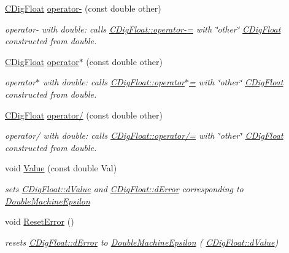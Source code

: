\begin{DoxyCompactItemize}
\hyperlink{classCDigFloat}{C\+Dig\+Float} \hyperlink{classCDigFloat_ad873c5c22f0f18e89caf7309a043bfa0}{operator-\/} (const double other)
\begin{DoxyCompactList}\small\item\em operator-\/ with double\+: calls \hyperlink{classCDigFloat_a7496a4f8445815e9a346076c3d90305a}{C\+Dig\+Float\+::operator-\/=} with \char`\"{}other\char`\"{} \hyperlink{classCDigFloat}{C\+Dig\+Float} constructed from double. \end{DoxyCompactList}\item 
\hyperlink{classCDigFloat}{C\+Dig\+Float} \hyperlink{classCDigFloat_aa699c4362ad8acfcd1649f93d805e105}{operator$\ast$} (const double other)
\begin{DoxyCompactList}\small\item\em operator$\ast$ with double\+: calls \hyperlink{classCDigFloat_a9535d47a31a3f1cfa487cc8c567a4a12}{C\+Dig\+Float\+::operator$\ast$=} with \char`\"{}other\char`\"{} \hyperlink{classCDigFloat}{C\+Dig\+Float} constructed from double. \end{DoxyCompactList}\item 
\hyperlink{classCDigFloat}{C\+Dig\+Float} \hyperlink{classCDigFloat_a4e9cc3b14f2b5a6d704957fb1a8de1a2}{operator/} (const double other)
\begin{DoxyCompactList}\small\item\em operator/ with double\+: calls \hyperlink{classCDigFloat_a53d3939dfc89d172f1bf803a46bc3369}{C\+Dig\+Float\+::operator/=} with \char`\"{}other\char`\"{} \hyperlink{classCDigFloat}{C\+Dig\+Float} constructed from double. \end{DoxyCompactList}\item 
void \hyperlink{classCDigFloat_af74b8cd0935294b6371f551b7a1ff640}{Value} (const double Val)
\begin{DoxyCompactList}\small\item\em sets \hyperlink{classCDigFloat_a4bbe69e30dd4e20527362493aa9aaf96}{C\+Dig\+Float\+::d\+Value} and \hyperlink{classCDigFloat_a25eb3782d1e727ff007a48f8308e3d4d}{C\+Dig\+Float\+::d\+Error} corresponding to \hyperlink{Utils_8h_adb19ed17b4e8ed0a8525c35fdc8872c3}{Double\+Machine\+Epsilon} \end{DoxyCompactList}\item 
void \hyperlink{classCDigFloat_a47dd744a2100dc850ede1511e616ed39}{Reset\+Error} ()
\begin{DoxyCompactList}\small\item\em resets \hyperlink{classCDigFloat_a25eb3782d1e727ff007a48f8308e3d4d}{C\+Dig\+Float\+::d\+Error} to \hyperlink{Utils_8h_adb19ed17b4e8ed0a8525c35fdc8872c3}{Double\+Machine\+Epsilon} ( \hyperlink{classCDigFloat_a4bbe69e30dd4e20527362493aa9aaf96}{C\+Dig\+Float\+::d\+Value}) \end{DoxyCompactList}\item 

\end{DoxyCompactItemize}
